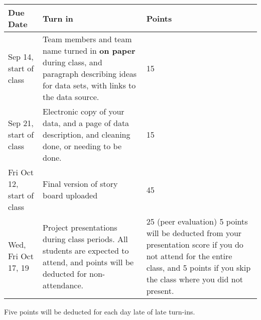 \documentclass{article}
\begin{document}
\begin{center}
\bigskip
\begin{tabular}{|p{2cm}|p{8cm}|p{5cm}|}\hline
  {\bf Due Date} & {\bf Turn in}  & {\bf Points} \\\hline
Sep 14, start of class & Team members and team name turned in {\bf on paper} during class, and paragraph describing ideas for data sets, with links to the data source.  & 15\\\hline
Sep 21, start of class & Electronic copy of your data, and a page of data description, and cleaning done, or needing to be done. & 15 \\\hline
Fri Oct 12, start of class & Final version of story board uploaded & 45 \\\hline
Wed, Fri Oct 17, 19 & Project presentations during class periods. All students are expected to attend, and points will be deducted for non-attendance. & 25 (peer evaluation) 5 points will be deducted from your presentation score if you do not attend for the entire class, and 5 points if you skip the class where you did not present. \\\hline
\end{tabular}
\end{center}
\bigskip

Five points will be deducted for each day late of late turn-ins.
\end{document}
